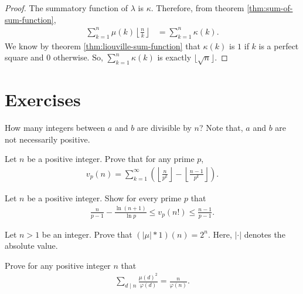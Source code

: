 \documentclass[12pt]{subfile}
\begin{document}
		\begin{proof}
			The summatory function of $\lambda$ is $\kappa$. Therefore, from theorem \ref{thm:sum-of-sum-function},
				\begin{align*}
					\sum_{k=1}^{n} \mu(k) \left\lfloor \frac{n}{k}\right\rfloor &= \sum_{k=1}^{n} \kappa(k).
				\end{align*}
			We know by theorem \ref{thm:liouville-sum-function} that $\kappa(k)$ is $1$ if $k$ is a perfect square and $0$ otherwise. So, $\sum\limits_{k=1}^{n} \kappa(k)$ is exactly $\lfloor \sqrt n \rfloor$.
		\end{proof}
\newpage
\section{Exercises}

	\begin{problem}
		How many integers between $a$ and $b$ are divisible by $n$? Note that, $a$ and $b$ are not necessarily positive.
	\end{problem}

	\begin{problem}
		Let $n$ be a positive integer. Prove that for any prime $p$,
			\begin{align*}
				v_p(n)= \sum_{k=1}^{\infty} \left(\left\lfloor \frac{n}{p^k}\right\rfloor - \left\lfloor \frac{n-1}{p^k}\right\rfloor\right).
			\end{align*}
	\end{problem}

	\begin{problem}%
		Let $n$ be a positive integer. Show for every prime $p$ that
			\begin{align*}
				\frac{n}{p-1} - \frac{\ln(n+1)}{\ln p} \leq v_p(n!) \leq \frac{n-1}{p-1}.
			\end{align*}
	\end{problem}

	\begin{problem}
		Let $n>1$ be an integer. Prove that $(|\mu|\ast 1)(n)=2^n$. Here, $|\cdot|$ denotes the absolute value.
	\end{problem}

	\begin{problem}
		Prove for any positive integer $n$ that
			\begin{align*}
				\sum_{d\mid n} \frac{\mu(d)^2}{\varphi(d)} = \frac{n}{\varphi(n)}.
			\end{align*}
	\end{problem}
\end{document}
